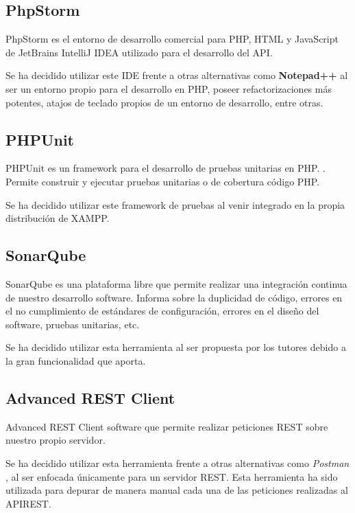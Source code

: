 \subsection{PhpStorm}

PhpStorm es el entorno de desarrollo comercial para PHP, HTML y JavaScript de JetBrains IntelliJ IDEA utilizado para el desarrollo del API. \cite{wiki:phpStorm}

Se ha decidido utilizar este IDE frente a otras alternativas como \textbf{Notepad++} \cite{wiki:notepad++} al ser un entorno propio para el desarrollo en PHP, poseer refactorizaciones más potentes, atajos de teclado propios de un entorno de desarrollo, entre otras.

\subsection{PHPUnit}

PHPUnit es un framework para el desarrollo de pruebas unitarias en PHP. \cite{wiki:phpunit}. Permite construir y ejecutar pruebas unitarias o de cobertura código PHP. 

Se ha decidido utilizar este framework de pruebas al venir integrado en la propia distribución de XAMPP.

\subsection{SonarQube}

SonarQube es una plataforma libre que permite realizar una  integración continua de nuestro desarrollo software. Informa sobre la duplicidad de código, errores en el no cumplimiento de estándares de configuración, errores en el diseño del software, pruebas unitarias, etc. \cite{wiki:sonarqube}

Se ha decidido utilizar esta herramienta al ser propuesta por los tutores debido a la gran funcionalidad que aporta.

\subsection{Advanced REST Client}

Advanced REST Client software que permite realizar peticiones REST sobre nuestro propio servidor. \cite{wiki:aresrclient}

Se ha decidido utilizar esta herramienta frente a otras alternativas como \emph{Postman} \cite{wiki:postman}, al ser enfocada únicamente para un servidor REST. Esta herramienta ha sido utilizada para depurar de manera manual cada una de las peticiones realizadas al APIREST.

